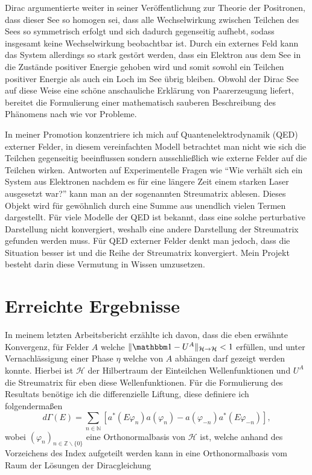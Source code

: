 \documentclass[a4paper,12pt]{article}
\newcommand{\id}{{\mathbbm 1}}
\begin{document}
Dirac argumentierte weiter in seiner Veröffentlichung zur Theorie der Positronen, 
dass dieser See so homogen sei, dass alle Wechselwirkung zwischen 
Teilchen des Sees so symmetrisch erfolgt und sich dadurch gegenseitig aufhebt, sodass insgesamt keine Wechselwirkung 
beobachtbar ist. Durch ein externes Feld kann das System allerdings so stark gestört werden, dass ein Elektron aus dem
See in die Zustände positiver Energie gehoben wird und somit sowohl ein Teilchen positiver Energie als auch ein Loch
im See übrig bleiben. Obwohl der Dirac See auf diese Weise eine schöne anschauliche Erklärung von Paarerzeugung liefert,
bereitet die Formulierung einer mathematisch sauberen Beschreibung des Phänomens nach wie vor Probleme. 

In meiner Promotion konzentriere ich mich auf Quantenelektrodynamik (QED) externer Felder, in diesem vereinfachten Modell 
betrachtet man nicht wie sich die Teilchen gegenseitig beeinflussen sondern ausschließlich wie externe Felder auf die Teilchen
wirken. Antworten auf Experimentelle Fragen wie ``Wie verhält sich ein System aus Elektronen nachdem es für eine längere 
Zeit einem starken Laser ausgesetzt war?'' kann man an der sogenannten Streumatrix ablesen. Dieses Objekt wird für 
gewöhnlich durch eine Summe aus unendlich vielen Termen dargestellt. Für viele Modelle der QED ist bekannt,
dass eine solche perturbative Darstellung nicht konvergiert, weshalb eine andere Darstellung der Streumatrix gefunden
werden muss. Für QED externer Felder denkt man jedoch, dass die Situation besser ist und 
die Reihe der Streumatrix konvergiert. Mein Projekt besteht darin diese Vermutung in Wissen umzusetzen.

\section{Erreichte Ergebnisse}

In meinem letzten Arbeitsbericht erzählte ich davon, dass die eben erwähnte Konvergenz, für Felder \(A\) welche
\(\|\id-U^A\|_{\mathcal{H}\rightarrow \mathcal{H}}<1\)
erfüllen, und unter Vernachlässigung einer Phase \(\eta\) welche von \(A\) abhängen darf gezeigt werden konnte.
 Hierbei ist \(\mathcal{H}\) der Hilbertraum der Einteilchen Wellenfunktionen und \(U^A\) die Streumatrix für eben
diese Wellenfunktionen. Für die Formulierung des Resultats benötige ich die differenzielle Liftung, diese 
definiere ich folgendermaßen 
\begin{equation}
d\Gamma(E)=\sum_{n\in \mathbb{N}} \left[a^*(E\varphi_n)a(\varphi_n) - a(\varphi_{-n})a^*(E\varphi_{-n})\right],
\end{equation}
wobei \( (\varphi_n)_{n\in \mathbb{Z}\backslash \{0\}}\) eine Orthonormalbasis von \(\mathcal{H}\) ist, welche anhand
des Vorzeichens des Index aufgeteilt werden kann in eine Orthonormalbasis vom Raum der Lösungen der Diracgleichung
\end{document}
